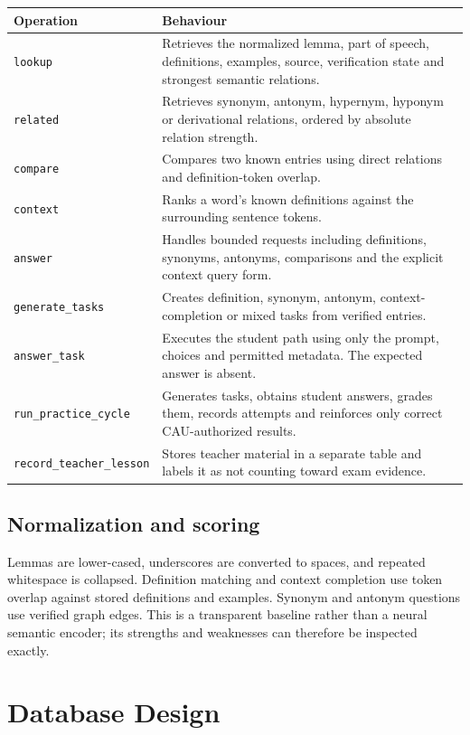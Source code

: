 \documentclass[11pt,a4paper]{article}
\begin{document}
\begin{longtable}{p{} p{}}
\toprule
Operation & Behaviour \\
\midrule
\endhead
\texttt{lookup} & Retrieves the normalized lemma, part of speech, definitions, examples,
source, verification state and strongest semantic relations. \\
\texttt{related} & Retrieves synonym, antonym, hypernym, hyponym or derivational relations,
ordered by absolute relation strength. \\
\texttt{compare} & Compares two known entries using direct relations and definition-token
overlap. \\
\texttt{context} & Ranks a word's known definitions against the surrounding sentence tokens. \\
\texttt{answer} & Handles bounded requests including definitions, synonyms, antonyms,
comparisons and the explicit context query form. \\
\texttt{generate\_tasks} & Creates definition, synonym, antonym, context-completion or mixed
tasks from verified entries. \\
\texttt{answer\_task} & Executes the student path using only the prompt, choices and permitted
metadata. The expected answer is absent. \\
\texttt{run\_practice\_cycle} & Generates tasks, obtains student answers, grades them, records
attempts and reinforces only correct CAU-authorized results. \\
\texttt{record\_teacher\_lesson} & Stores teacher material in a separate table and labels it as
not counting toward exam evidence. \\
\bottomrule
\end{longtable}

\subsection{Normalization and scoring}

Lemmas are lower-cased, underscores are converted to spaces, and repeated whitespace is
collapsed. Definition matching and context completion use token overlap against stored
definitions and examples. Synonym and antonym questions use verified graph edges. This is a
transparent baseline rather than a neural semantic encoder; its strengths and weaknesses can
therefore be inspected exactly.

\section{Database Design}
\end{document}
